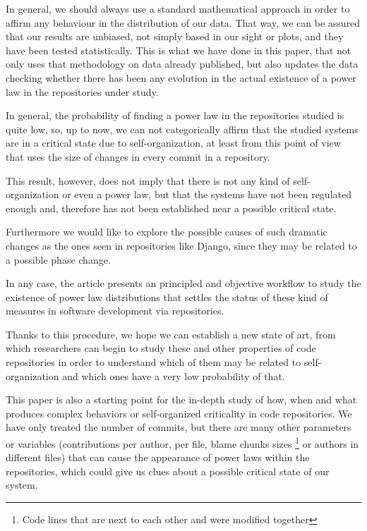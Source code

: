 \documentclass{article}
\begin{document}
In general, we should always use a standard mathematical approach in
order to affirm any behaviour in the distribution of our data. That way, we
can be assured that our results are unbiased, not simply based in our sight or
plots, and they have been tested statistically. This is what we have
done in this paper, that not only uses that methodology on data already published,
but also updates the data checking whether there has been any
evolution in the actual existence of a power law in the repositories
under study.

In general, the probability of finding a power law in the repositories
studied is quite low, so, up to now, we can not categorically affirm 
that the studied systems are in a critical state due to
self-organization, at least from this point of view that uses the size of changes in every commit in a repository.

This result, however, does not imply that there is not any kind of
self-organization or even a power law, but that the systems have not
been regulated enough and, therefore has not been established near a
possible critical state.

Furthermore we would like to explore the possible causes of such
dramatic changes as the ones seen in repositories like Django, since
they may be related to a possible phase change. %

In any case, the article presents an principled and objective workflow
to study the existence of power law distributions that settles the
status of these kind of measures in software development via
repositories.

Thanks to this procedure, we hope we can establish a new state of
art, from which researchers can begin to study these and other
properties of code repositories in order to understand which of them
may be related to self-organization and which ones have a very low
probability of that.

This paper is also a starting point for the in-depth study of how,
when and what produces complex behaviors or self-organized criticality
in code repositories. We have only treated the number of commits, but
there are many other parameters or variables (contributions per
author, per file, blame chunks sizes \footnote{Code lines that are next to
  each other and were modified together} or authors in different
files) that can cause the appearance of power laws within the
repositories, which could give us clues about a possible critical
state of our system.
\end{document}
